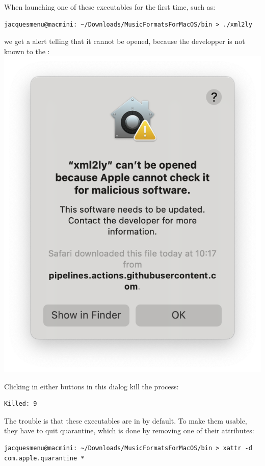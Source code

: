 When launching one of these executables for the first time, such as:
\begin{lstlisting}[language=Terminal]
jacquesmenu@macmini: ~/Downloads/MusicFormatsForMacOS/bin > ./xml2ly
\end{lstlisting}
we get a alert telling that it cannot be opened, because the developper is not known to the \OS:\\
\includegraphics[scale=0.35]{../graphics/MacOSMaliciousSoftwareAlert.png}

Clicking in either buttons in this dialog kill the process:
\begin{lstlisting}[language=Terminal]
Killed: 9
\end{lstlisting}

The trouble is that these executables are in {\it \quarantine} by default. To make them usable, they have to quit quarantine, which is done by removing one of their attributes:
\begin{lstlisting}[language=Terminal]
jacquesmenu@macmini: ~/Downloads/MusicFormatsForMacOS/bin > xattr -d com.apple.quarantine *
\end{lstlisting}

